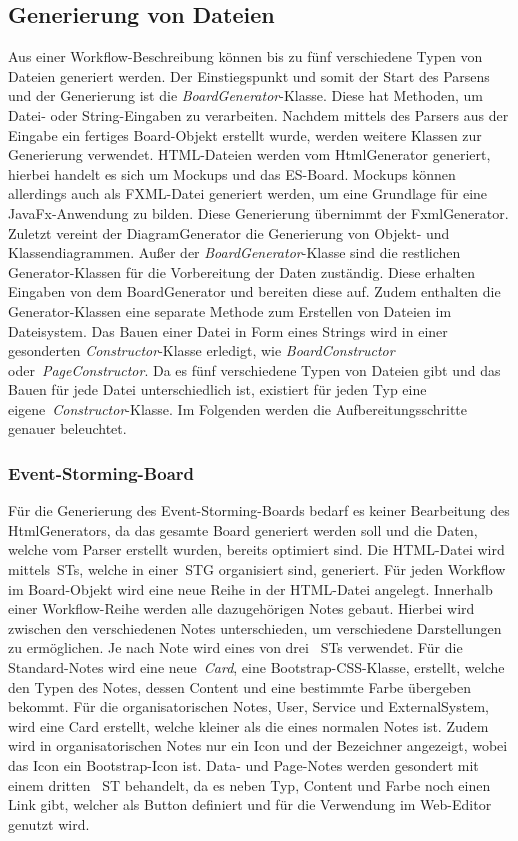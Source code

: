 \subsection{Generierung von Dateien}\label{subsec:generierung-von-dateien}
Aus einer Workflow-Beschreibung können bis zu fünf verschiedene Typen von Dateien generiert werden.
Der Einstiegspunkt und somit der Start des Parsens und der Generierung ist die \textit{BoardGenerator}-Klasse.
Diese hat Methoden, um Datei- oder String-Eingaben zu verarbeiten.
Nachdem mittels des Parsers aus der Eingabe ein fertiges Board-Objekt erstellt wurde, werden weitere Klassen zur Generierung verwendet.
HTML-Dateien werden vom HtmlGenerator generiert, hierbei handelt es sich um Mockups und das \ac{ES}-Board.
Mockups können allerdings auch als FXML-Datei generiert werden, um eine Grundlage für eine JavaFx-Anwendung zu bilden.
Diese Generierung übernimmt der FxmlGenerator.
Zuletzt vereint der DiagramGenerator die Generierung von Objekt- und Klassendiagrammen.
Außer der \textit{BoardGenerator}-Klasse sind die restlichen Generator-Klassen für die Vorbereitung der Daten zuständig.
Diese erhalten Eingaben von dem BoardGenerator und bereiten diese auf.
Zudem enthalten die Generator-Klassen eine separate Methode zum Erstellen von Dateien im Dateisystem.
Das Bauen einer Datei in Form eines Strings wird in einer gesonderten \textit{Constructor}-Klasse erledigt, wie \textit{BoardConstructor} oder~\textit{PageConstructor}.
Da es fünf verschiedene Typen von Dateien gibt und das Bauen für jede Datei unterschiedlich ist, existiert für jeden Typ eine eigene~\textit{Constructor}-Klasse.
Im Folgenden werden die Aufbereitungsschritte genauer beleuchtet.

\subsubsection{Event-Storming-Board}
Für die Generierung des Event-Storming-Boards bedarf es keiner Bearbeitung des HtmlGenerators, da das gesamte Board generiert werden soll und die Daten,
welche vom Parser erstellt wurden, bereits optimiert sind.
Die HTML-Datei wird mittels~\acp{ST}, welche in einer~\ac{STG} organisiert sind, generiert.
Für jeden Workflow im Board-Objekt wird eine neue Reihe in der HTML-Datei angelegt.
Innerhalb einer Workflow-Reihe werden alle dazugehörigen Notes gebaut.
Hierbei wird zwischen den verschiedenen Notes unterschieden, um verschiedene Darstellungen zu ermöglichen.
Je nach Note wird eines von drei ~\acp{ST} verwendet.
Für die Standard-Notes wird eine neue~\textit{Card}, eine Bootstrap-CSS-Klasse, erstellt, welche den Typen des Notes, dessen Content und eine bestimmte Farbe übergeben bekommt.
Für die organisatorischen Notes, User, Service und ExternalSystem, wird eine Card erstellt, welche kleiner als die eines normalen Notes ist.
Zudem wird in organisatorischen Notes nur ein Icon und der Bezeichner angezeigt, wobei das Icon ein Bootstrap-Icon ist.
Data- und Page-Notes werden gesondert mit einem dritten ~\ac{ST} behandelt, da es neben Typ, Content und Farbe noch einen Link gibt, welcher als Button definiert und für die Verwendung
im Web-Editor genutzt wird.

